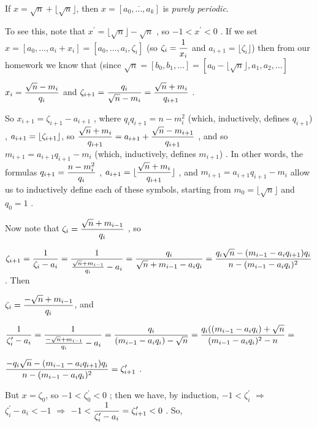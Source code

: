 \ssk

If $x=\sqrt{n}+\lfloor \sqrt{n}\rfloor$, then $x=[\overline{a_0,\ldots , a_k}]$ is {\it purely periodic}.

\ssk

To see this, note that $x^\prime = \lfloor \sqrt{n}\rfloor - \sqrt{n}$ , so $-1<x^\prime < 0$ .
If we set $x=[a_0,\ldots , a_i+x_i] = [a_0,\ldots , a_i,\zeta_i]$ (so $\displaystyle \zeta_i={{1}\over{x_i}}$  
and $a_{i+1} = \lfloor\zeta_i \rfloor$) then from our homework we know that (since
$\sqrt{n} = [b_0,b_1,\ldots] = [a_0-\lfloor\sqrt{n}\rfloor,a_1,a_2,\ldots]$

$\displaystyle x_i = {{\sqrt{n}-m_i}\over{q_i}}$ and 
$\displaystyle \zeta_{i+1} = {{q_i}\over{\sqrt{n}-m_i}} = {{\sqrt{n}+m_i}\over{q_{i+1}}}$ . 

So
$x_{i+1} = \zeta_{i+1}-a_{i+1}$ , where $q_iq_{i+1} = n-m_i^2$ (which, inductively, defines
$q_{i+1}$) , 
$\displaystyle a_{i+1} = \lfloor\zeta_{i+1}\rfloor$, so $\displaystyle  {{\sqrt{n}+m_i}\over{q_{i+1}}} = a_{i+1} + {{\sqrt{n}-m_{i+1}}\over{q_{i+1}}}$ , and so
$m_{i+1} = a_{i+1}q_{i+1} - m_i$ (which, inductively, defines $m_{i+1}$) . 
In other words, the formulas 
$\displaystyle q_{i+1} = {{n-m_i^2}\over{q_i}}$ , 
$\displaystyle a_{i+1}=\lfloor{{\sqrt{n}+m_i}\over{q_{i+1}}}\rfloor$ , 
and $m_{i+1} = a_{i+1}q_{i+1} - m_i$ allow us to inductively 
define each of these symbols, starting from 
$m_0=\lfloor\sqrt{n}\rfloor$ and $q_0=1$ .

\ssk

Now note that $\displaystyle \zeta_i = {{\sqrt{n}+m_{i-1}}\over{q_i}}$ , so 

$\displaystyle \zeta_{i+1} = {{1}\over{\zeta_i-a_i}} = {{1}\over{{{\sqrt{n}+m_{i-1}}\over{q_i}} - a_i}}
= {{q_i}\over{\sqrt{n}+m_{i-1} - a_iq_i}}
 = {{q_i\sqrt{n}-(m_{i-1}-a_iq_{i+1})q_i}\over{n-(m_{i-1}-a_iq_i)^2}}$ . Then

$\displaystyle \zeta_i = {{-\sqrt{n}+m_{i-1}}\over{q_i}}$, and 

$\displaystyle {{1}\over{\zeta_i^\prime-a_i}} = 
{{1}\over{{{-\sqrt{n}+m_{i-1}}\over{q_i}} - a_i}} = {{q_i}\over{(m_{i-1}-a_iq_i)-\sqrt{n}}} = 
{{q_i((m_{i-1}-a_iq_i)+\sqrt{n}}\over{(m_{i-1}-a_iq_i)^2-n}} = $

$\displaystyle {{-q_i\sqrt{n}-(m_{i-1}-a_iq_{i+1})q_i}\over{n-(m_{i-1}-a_iq_i)^2}} = \zeta_{i+1}^\prime$ .

But $x=\zeta_0$, so $-1<\zeta_0^\prime<0$ ; then we have, by induction, 
$-1<\zeta_i^\prime$ $\Rightarrow$ $\zeta_i^\prime - a_i < -1$ $\Rightarrow$
$\displaystyle -1<{{1}\over{\zeta_i^\prime - a_i}} = \zeta_{i+1}^\prime < 0$ . So, 

